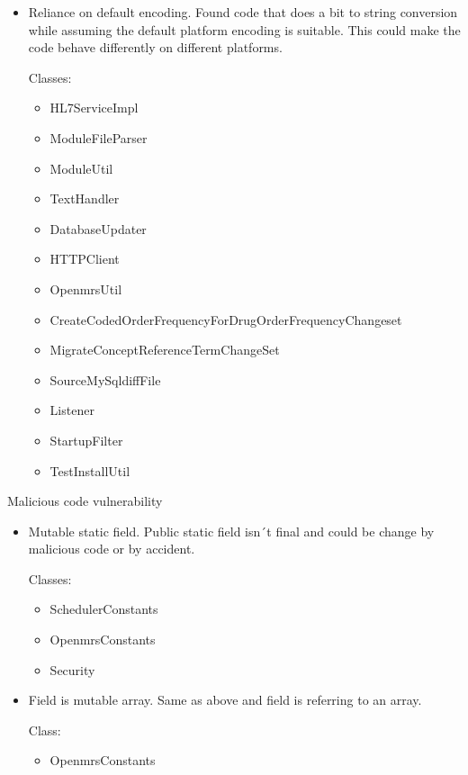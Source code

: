 \documentclass{article}
\begin{document}
  \begin{itemize}
    \item Reliance on default encoding. 
      Found code that does a bit to string conversion while assuming
      the default platform encoding is suitable. This could make the code
      behave differently on different platforms.

      Classes:

      \begin{itemize}
        \item HL7ServiceImpl
        \item ModuleFileParser
        \item ModuleUtil
        \item TextHandler
        \item DatabaseUpdater
        \item HTTPClient
        \item OpenmrsUtil
        \item CreateCodedOrderFrequencyForDrugOrderFrequencyChangeset
        \item MigrateConceptReferenceTermChangeSet
        \item SourceMySqldiffFile
        \item Listener
        \item StartupFilter
        \item TestInstallUtil
      \end{itemize}
  \end{itemize}
Malicious code vulnerability
  \begin{itemize}
    \item Mutable static field. 
      Public static field isn´t final and could be change by malicious
      code or by accident.

      Classes:

      \begin{itemize}
        \item SchedulerConstants
        \item OpenmrsConstants
        \item Security
      \end{itemize}
  \item Field is mutable array. 
    Same as above and field is referring to an array.

    Class:

    \begin{itemize}
      \item OpenmrsConstants
    \end{itemize}
  \end{itemize}
\end{document}
